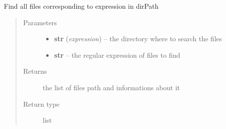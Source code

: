 \documentclass[a4paper,10pt,english]{sphinxmanual}
\begin{document}
\begin{fulllineitems}
\label{commands/apidoc/src:src.logger.list_log_file}
Find all files corresponding to expression in dirPath
\begin{quote}\begin{description}
\item[{Parameters}] \leavevmode\begin{itemize}
\item {} 
\textbf{str} (\emph{expression}) -- the directory where to search the files

\item {} 
\textbf{str} -- the regular expression of files to find

\end{itemize}

\item[{Returns}] \leavevmode
the list of files path and informations about it

\item[{Return type}] \leavevmode
list

\end{description}\end{quote}

\end{fulllineitems}

\end{document}
